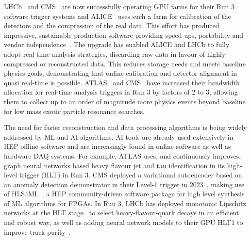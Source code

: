 \documentclass[10pt,a4paper]{article}
\begin{document}
LHCb~\cite{LHCb:RTDP} and CMS~\cite{CMS:Detector_R3}
are now successfully operating GPU farms for their
Run 3 software trigger systems and ALICE~\cite{ALICE:LS2_upgrades} uses such a farm for
calibration of the detectors and the compression of the real data. This
effort has produced impressive, sustainable production software providing
speed-ups, portability and vendor
independence~\cite{Concas:2024cyu, Aaij2020Allen,MathesP3MA2017}. The
upgrade has enabled ALICE and LHCb to fully adopt real-time analysis strategies,
discarding raw data in favour of highly compressed or reconstructed
data. This reduces storage needs and meets baseline physics goals, demonstrating that
online calibration and detector alignment in quasi real-time is possible.
ATLAS~\cite{ATLAS:trigger_LS3} and CMS~\cite{CMS:enriching_phys_programmes}
have increased their bandwidth allocation for real-time
analysis triggers in Run 3 by factors of 2 to 3, allowing them to
collect up to an order of magnitude more physics events beyond
baseline for low mass exotic particle resonance searches.

The need for faster reconstruction and data processing algorithms is being
widely addressed by ML and AI algorithms. AI tools are already used extensively
in HEP offline software and are increasingly found in online software as well as
hardware DAQ systems. For example, ATLAS uses, and continuously improves, graph
neural networks based heavy flavour jet and tau identification in its high-level
trigger (HLT)\cite{ATLAS:perf_commissioning} in Run 3.
CMS deployed a variational autoencoder based on
an anomaly detection demonstrator in their Level-1 trigger in 2023~\cite{CMS-DP-2023-079},
making use of HLS4ML~\cite{fastml_team_hls4ml}, a HEP community-driven
software package for high level synthesis of ML algorithms for FPGAs. In Run 3,
LHCb has deployed monotonic Lipschitz networks at the HLT
stage~\cite{LHCb:Lipschitz} to select heavy-flavour-quark decays in an efficient
and robust way, as well as adding neural network models to their GPU HLT1 to
improve track purity~\cite{neuralmodelHLT1LHCb}.
\end{document}
